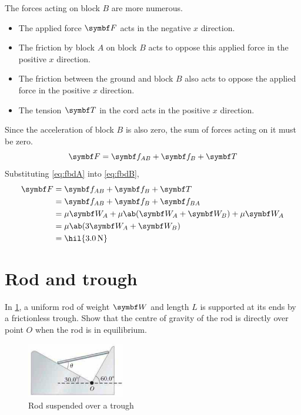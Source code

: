 The forces acting on block \(B\) are more numerous.
\begin{itemize}
  \item The applied force \(\mv{F}\) acts in the negative \(x\) direction.
  \item The friction by block \(A\) on block \(B\) acts to oppose
    this applied force in the positive \(x\) direction.
  \item The friction between the ground and block \(B\) also acts to
    oppose the applied force in the positive \(x\) direction.
  \item The tension \(\mv{T}\) in the cord acts in the positive \(x\) direction.
\end{itemize}
Since the acceleration of block \(B\) is also zero, the sum of forces
acting on it must be zero.
\begin{equation}
  \mv{F} = \mv{f}_{AB} + \mv{f}_B + \mv{T}
  \label{eq:fbdB}
\end{equation}
Substituting \cref{eq:fbdA} into \cref{eq:fbdB},
\begin{align*}
  \mv{F} &= \mv{f}_{AB} + \mv{f}_B + \mv{T} \\
  &= \mv{f}_{AB} + \mv{f}_B + \mv{f}_{BA} \\
  &= \mu\mv{W}_A + \mu\ab(\mv{W}_A + \mv{W}_B) + \mu\mv{W}_A \\
  &= \mu\ab(3\mv{W}_A + \mv{W}_B) \\
  &= \hil{\qty{3.0}{\newton}}
\end{align*}

\section{Rod and trough}
\begin{problem}
  In \cref{fig:rodtrough}, a uniform rod of weight \(\mv{W}\) and
  length \(L\) is supported at its ends by a frictionless trough.
  Show that the centre of gravity of the rod is directly over point \(O\) when
  the rod is in equilibrium.
\end{problem}
\begin{figure}
  \centering
  \includegraphics[width=0.38\textwidth]{assets/rodtrough.png}
  \caption{Rod suspended over a trough}
  \label{fig:rodtrough}
\end{figure}

